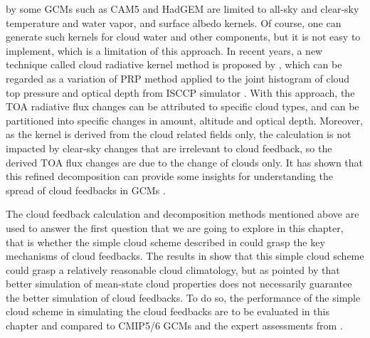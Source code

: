 by some GCMs such as CAM5 \citep{Pendergrass2018} and HadGEM \citep{Smith2020} are limited to all-sky and clear-sky temperature and water vapor, and surface albedo kernels. Of course, one can generate such kernels for cloud water and other components, but it is not easy to implement, which is a limitation of this approach. In recent years, a new technique called cloud radiative kernel method is proposed by \cite{Zelinka2012computing1,Zelinka2012computing2}, which can be regarded as a variation of PRP method applied to the joint histogram of cloud top pressure and optical depth from ISCCP simulator \citep{Klein1999validation,Webb2001combining}. With this approach, the TOA radiative flux changes can be attributed to specific cloud types, and can be partitioned into specific changes in amount, altitude and optical depth. Moreover, as the kernel is derived from the cloud related fields only, the calculation is not impacted by clear-sky changes that are irrelevant to cloud feedback, so the derived TOA flux changes are due to the change of clouds only. It has shown that this refined decomposition can provide some insights for understanding the spread of cloud feedbacks in GCMs \citep[e.g.,][]{Zelinka2016insights,Zelinka2020causes,Zelinka2021evaluating}.

The cloud feedback calculation and decomposition methods mentioned above are used to answer the first question that we are going to explore in this chapter, that is whether the simple cloud scheme described in  could grasp the key mechanisms of cloud feedbacks. The results in  show that this simple cloud scheme could grasp a relatively reasonable cloud climatology, but as pointed by \cite{Zelinka2021evaluating} that better simulation of mean-state cloud properties does not necessarily guarantee the better simulation of cloud feedbacks. To do so, the performance of the simple cloud scheme in simulating the cloud feedbacks are to be evaluated in this chapter and compared to CMIP5/6 GCMs and the expert assessments from \cite{Sherwood2020}. 

